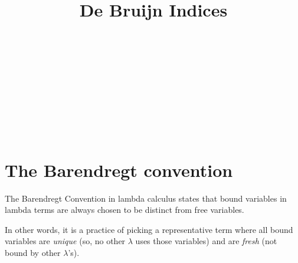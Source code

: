 \documentclass{lecturenotes}
\title{De Bruijn Indices}
\begin{document}
\maketitle

\begin{code}%
\>[0]\AgdaSpace{}%
\AgdaSpace{}%
\<%
\\
\>[0]\AgdaSpace{}%
\AgdaSpace{}%
\AgdaSpace{}%
\AgdaSpace{}%
\AgdaSymbol{(}\AgdaSymbol{;}\AgdaSpace{}%
\AgdaSymbol{;}\AgdaSpace{}%
\AgdaSymbol{)}\<%
\\
\>[0]\AgdaSpace{}%
\AgdaSpace{}%
\AgdaSpace{}%
\AgdaSpace{}%
\AgdaSymbol{(}\AgdaSymbol{)}\<%
\\
%
\\[\AgdaEmptyExtraSkip]%
\>[0]\AgdaSpace{}%
\AgdaSpace{}%
\AgdaSymbol{:}\AgdaSpace{}%
\AgdaSpace{}%
\<%
\\
\>[0][@{}l@{\AgdaIndent{0}}]%
\>[2]\AgdaSpace{}%
\AgdaSymbol{:}\AgdaSpace{}%
\AgdaSpace{}%
\AgdaSpace{}%
\<%
\\
%
\>[2]\AgdaSpace{}%
\AgdaSymbol{:}\AgdaSpace{}%
\AgdaSpace{}%
\AgdaSpace{}%
\<%
\\
%
\>[2]\AgdaSpace{}%
\AgdaSymbol{:}\AgdaSpace{}%
\AgdaSpace{}%
\AgdaSpace{}%
\AgdaSpace{}%
\AgdaSpace{}%
\<%
\end{code}

\section{The Barendregt convention}
The Barendregt Convention in lambda calculus states that bound variables in lambda terms are always chosen to be distinct from free variables. 

\noindent In other words, it is a practice of picking a representative term where all bound variables are \emph{unique} (so, no other $\lambda$ uses those variables) and are \emph{fresh} (not bound by other $\lambda$'s).
\end{document}
